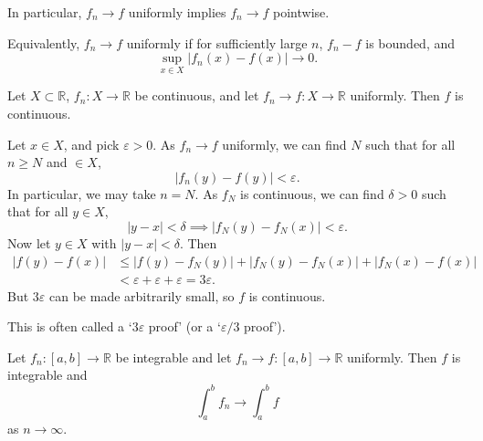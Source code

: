 \documentclass[12pt]{article}
\begin{document}
In particular, $f_n \to f$ uniformly implies $f_n \to f$ pointwise.

Equivalently, $f_n \to f$ uniformly if for sufficiently large $n$, $f_n - f$ is bounded, and
\[
	\sup_{x \in X} |f_n(x) - f(x)| \to 0
.\]

\begin{theorem}
	Let $X \subset \mathbb{R}$, $f_n : X \to \mathbb{R}$ be continuous, and let $f_n \to f : X \to \mathbb{R}$ uniformly. Then $f$ is continuous.
\end{theorem}

\begin{proofbox}
	Let $x \in X$, and pick $\varepsilon > 0$. As $f_n \to f$ uniformly, we can find $N$ such that for all $n \geq N$ and $ \in X$,
	\[
		|f_n(y) - f(y)| < \varepsilon
	.\]
	In particular, we may take $n = N$. As $f_N$ is continuous, we can find $\delta > 0$ such that for all $y \in X$, 
	\[
		|y - x| < \delta \implies |f_N(y) - f_N(x)| < \varepsilon
	.\]
	Now let $y \in X$ with $|y - x| < \delta$. Then
	\begin{align*}
		|f(y) - f(x)| &\leq |f(y) - f_N(y)| + |f_N(y) - f_N(x)| + |f_N(x) - f(x)| \\
			      &< \varepsilon + \varepsilon + \varepsilon = 3 \varepsilon.
	\end{align*}
	But $3\varepsilon$ can be made arbitrarily small, so $f$ is continuous.
\end{proofbox}

\begin{remark}
	This is often called a `$3\varepsilon$ proof' (or a `$\varepsilon/3$ proof').
\end{remark}

\begin{theorem} 
	Let $f_n : [a, b] \to \mathbb{R}$ be integrable and let $f_n \to f : [a, b] \to \mathbb{R}$ uniformly. Then $f$ is integrable and
	\[
	\int_{a}^{b} f_n \to \int_{a}^{b} f
	\]
	as $n \to \infty$.
\end{theorem}
\end{document}
